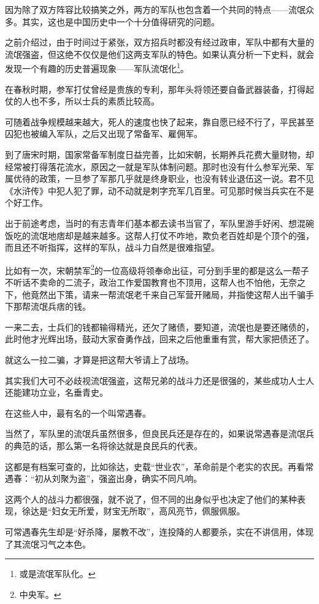 \begin{multicols}{\theparacolNo}
		因为除了双方阵容比较搞笑之外，两方的军队也包含着一个共同的特点——流氓众多。其实，这也是中国历史中一个十分值得研究的问题。

		之前介绍过，由于时间过于紧张，双方招兵时都没有经过政审，军队中都有大量的流氓强盗，但这绝不仅仅是他们这两支军队的特色。如果认真分析一下史料，就会发现一个有趣的历史普遍现象——军队流氓化\footnote{或是流氓军队化。}。

		在春秋时期，参军打仗曾经是贵族的专利，那年头将领还要自备武器装备，打得起仗的人也不多，所以士兵的素质比较高。

		可随着战争规模越来越大，死人的速度也快了起来，靠自愿已经不行了，平民甚至囚犯也被编入军队，之后又出现了常备军、雇佣军。

		到了唐宋时期，国家常备军制度日益完善，比如宋朝，长期养兵花费大量财物，却经常被打得落花流水，原因之一就是军队体制问题。那时也没有什么参军光荣、军属优待的政策，一旦参了军那几乎就是终身职业，也没有转业退伍这一说。君不见《水浒传》中犯人犯了罪，动不动就是刺字充军几百里。可见那时候当兵实在不是个好工作。

		出于前途考虑，当时的有志青年们基本都去读书当官了，军队里游手好闲、想混碗饭吃的流氓地痞却是越来越多。这帮人打仗不咋地，欺负老百姓却是个顶个的强，而且还不听指挥，这样的军队，战斗力自然是很难指望。

		比如有一次，宋朝禁军\footnote{中央军。}的一位高级将领奉命出征，可分到手里的都是这么一帮子不听话不卖命的二流子，政治工作爱国教育也不顶用，这帮人也不怕他，无奈之下，他竟然出下策，请来一帮流氓老千来自己军营开赌局，并指使这帮人出千骗手下那帮流氓兵痞的钱。

		一来二去，士兵们的钱都输得精光，还欠了赌债，要知道，流氓也是要还赌债的，此时他才光辉出场，鼓动大家奋勇作战，回来之后他重重有赏，帮大家把债还了。

		就这么一拉二骗，才算是把这帮大爷请上了战场。

		其实我们大可不必歧视流氓强盗，这帮兄弟的战斗力还是很强的，某些成功人士人还能建功立业，名垂青史。

		在这些人中，最有名的一个叫常遇春。

		当然了，军队里的流氓兵虽然很多，但良民兵还是存在的，如果说常遇春是流氓兵的典范的话，那么第一名将徐达就是良民兵的代表。

		这都是有档案可查的，比如徐达，史载“世业农”，革命前是个老实的农民。再看常遇春：“初从刘聚为盗”，强盗出身，确实不同凡响。

		这两个人的战斗力都很强，就不说了，但不同的出身似乎也决定了他们的某种表现，徐达是“妇女无所爱，财宝无所取”，高风亮节，佩服佩服。

		可常遇春先生却是“好杀降，屡教不改”，连投降的人都要杀，实在不讲信用，体现了其流氓习气之本色。


\end{multicols}
